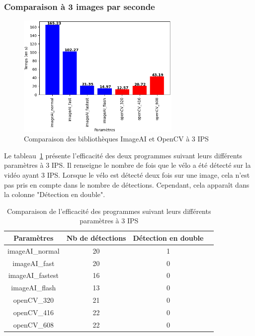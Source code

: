 \subsubsection{Comparaison à 3 images par seconde}
\label{sec:comparaisonIA:resultats:3fps}

\begin{figure}[H]
    \centering
    \includegraphics[width=0.7\textwidth]{img/result_3fps.png}
    \caption{Comparaison des bibliothèques ImageAI et OpenCV à 3 IPS}
\end{figure}

Le tableau~\ref{tab_3fps} présente l'efficacité des deux programmes suivant leurs différents paramètres à 3 IPS.
Il renseigne le nombre de fois que le vélo a été détecté sur la vidéo ayant 3 IPS.
Lorsque le vélo est détecté deux fois sur une image, cela n'est pas pris en compte dans le nombre de détections.
Cependant, cela apparaît dans la colonne "Détection en double".

\begin{table}[H]
    \centering
    \begin{tabular}{|c|c|c|c|}
        \hline
        \rowcolor{tableColorDark} Paramètres & Nb de détections & Détection en double \\
        \hline

        imageAI\_normal                      & 20               & 1                   \\\hline
        imageAI\_fast                        & 20               & 0                   \\\hline
        imageAI\_fastest                     & 16               & 0                   \\\hline
        imageAI\_flash                       & 13               & 0                   \\\hline
        openCV\_320                          & 21               & 0                   \\\hline
        openCV\_416                          & 22               & 0                   \\\hline
        openCV\_608                          & 22               & 0                   \\\hline
    \end{tabular}
    \caption{Comparaison de l'efficacité des programmes suivant leurs différents paramètres à 3 IPS}
    \label{tab_3fps}
\end{table}

